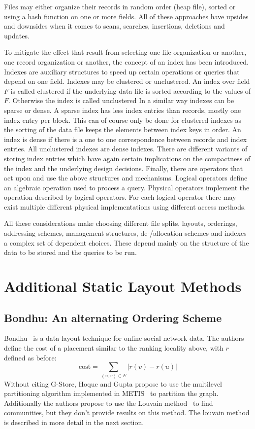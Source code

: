     Files may either organize their records in random order (heap file), sorted or using a hash function on one or more fields. 
    All of these approaches have upsides and downsides when it comes to scans, searches, insertions, deletions and updates. 

    To mitigate the effect that result from selecting one file organization or another, one record organization or another, the concept of an index has been introduced. 
    Indexes are auxiliary structures to speed up certain operations or queries that depend on one field. 
    Indexes may be clustered or unclustered. 
    An index over field $F$ is called clustered if the underlying data file is sorted according to the values of $F$. 
    Otherwise the index is called unclustered
    In a similar way indexes can be sparse or dense. 
    A sparse index has less index entries than records, mostly one index entry per block. 
    This can of course only be done for clustered indexes as the sorting of the data file keeps the elements between index keys in order. 
    An index is dense if there is a one to one correspondence between records and index entries. 
    All unclustered indexes are dense indexes.
    There are different variants of storing index entries which have again certain implications on the compactness of the index and the underlying design decisions.
    Finally, there are operators that act upon and use the above structures and mechanisms. 
    Logical operators define an algebraic operation used to process a query.
    Physical operators implement the operation described by logical operators. For each logical operator there may exist multiple different physical implementations using different access methods.

    All these considerations make choosing different file splits, layouts, orderings, addressing schemes, management structures, de-/allocation schemes and indexes a complex set of dependent choices. 
    These depend mainly on the structure of the data to be stored and the queries to be run.

    \section{Additional Static Layout Methods}
    \subsection{Bondhu: An alternating Ordering Scheme}
    Bondhu~\autocite{hoque2012disk} is a data layout technique for online social network data. 
    The authors define the cost of a placement similar to the ranking locality above, with $r$ defined as before: \[ \text{cost} = \sum_{(u, v) \in E} |r(v) - r(u)| \]   
    Without citing G-Store, Hoque and Gupta propose to use the multilevel partitioning algorithm implemented in METIS~\autocite{karypis} to partition the graph. Additionally the authors propose to use the Louvain method~\autocite{blondel2008fast} to find communities, but they don't provide results on this method. The louvain method is described in more detail in the next section. \\
    
